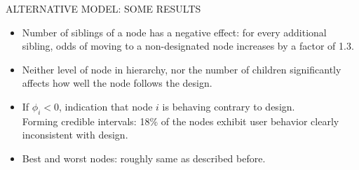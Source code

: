 \documentclass{report}
\newcommand{\head}[1]
{
  \begin{center}
      {\huge {\color{blue} #1}}
    \end{center}
  }
\begin{document}
\newpage\head{ALTERNATIVE MODEL: SOME RESULTS} %
\begin{itemize}
\item Number of siblings of a node has a negative effect: for every additional sibling, 
 odds of moving to a non-designated node increases by a factor of 1.3.
\item Neither level of node in hierarchy, nor the number of children significantly 
affects how well the node follows the design. %
\item If $\phi_i<0$, indication that node $i$ is behaving contrary to design.\\
  Forming credible intervals: 18\% of the nodes exhibit user behavior
  clearly inconsistent with design. %
\item Best and worst nodes: roughly same as described before.
\end{itemize}

\end{document}
